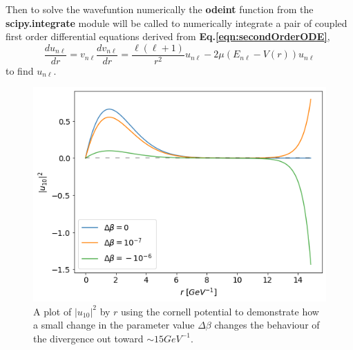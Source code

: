 \documentclass[10pt,twocolumn]{revtex4}    %
\begin{document}
Then to solve the wavefuntion numerically the \textbf{odeint} function from the \textbf{scipy.integrate} module will be called to numerically integrate a pair of coupled first order differential equations derived from \textbf{Eq.\ref{eqn:secondOrderODE}},
\begin{subequations}\label{eqn:coupledODEs}

    \begin{equation}\label{seqn:duODE}
        \frac{du_{n \ell}}{dr} = v_{n \ell}
    \end{equation}
    
    \begin{equation}\label{seqn:dvODE}
       \frac{dv_{n \ell}}{dr} = \frac{\ell(\ell + 1)}{r^2}u_{n \ell} - 2\mu(E_{n \ell} - V(r))u_{n \ell}
    \end{equation}
    
\end{subequations}
to find $u_{n\ell}$.


\begin{figure}[t]
    \centering
    \includegraphics[width=\linewidth]{DivFlip.png}
    \caption{A plot of $|u_{10}|^2$ by $r$ using the cornell potential to demonstrate how a small change in the parameter value $\Delta \beta$ changes the behaviour of the divergence out toward $\sim15GeV^{-1}$.}
    \label{fig:divFlip}
\end{figure}
\end{document}
